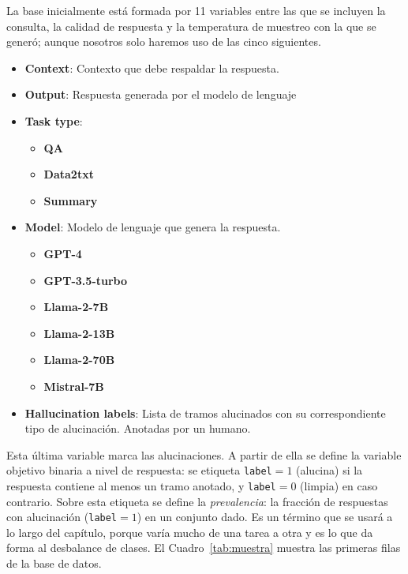 \documentclass[12pt,a4paper]{report}
\theoremstyle{definition}
\newcommand{\tc}[1]{\texttt{#1}}
\begin{document}
La base inicialmente está formada por 11 variables entre las que se incluyen la consulta, la calidad de respuesta y la temperatura de muestreo con la que se generó; aunque nosotros solo haremos uso de las cinco siguientes.
\begin{itemize}
  \item \textbf{Context}: Contexto que debe respaldar la respuesta.
  \item \textbf{Output}: Respuesta generada por el modelo de lenguaje
  \item \textbf{Task type}: 
  \begin{itemize}
    \item \textbf{QA} 
    \item \textbf{Data2txt} 
    \item \textbf{Summary} 
  \end{itemize}
  \item \textbf{Model}: Modelo de lenguaje que genera la respuesta.
  \begin{itemize}
    \item \textbf{GPT-4} 
    \item \textbf{GPT-3.5-turbo} 
    \item \textbf{Llama-2-7B} 
    \item \textbf{Llama-2-13B} 
    \item \textbf{Llama-2-70B} 
    \item \textbf{Mistral-7B} 
  \end{itemize}
  \item \textbf{Hallucination labels}: Lista de tramos alucinados con su correspondiente tipo de alucinación. Anotadas por un humano.
\end{itemize}

Esta última variable marca las alucinaciones. A partir de ella se define la variable objetivo
binaria a nivel de respuesta: se etiqueta \tc{label}${}=1$ (alucina) si la respuesta
contiene al menos un tramo anotado, y \tc{label}${}=0$ (limpia) en caso contrario. Sobre esta
etiqueta se define la \emph{prevalencia}: la fracción de respuestas con alucinación
(\tc{label}${}=1$) en un conjunto dado. Es un término que se usará a lo largo del capítulo,
porque varía mucho de una tarea a otra y es lo que da forma al desbalance de clases. El
Cuadro~\ref{tab:muestra} muestra las primeras filas de la base de datos.
\end{document}
